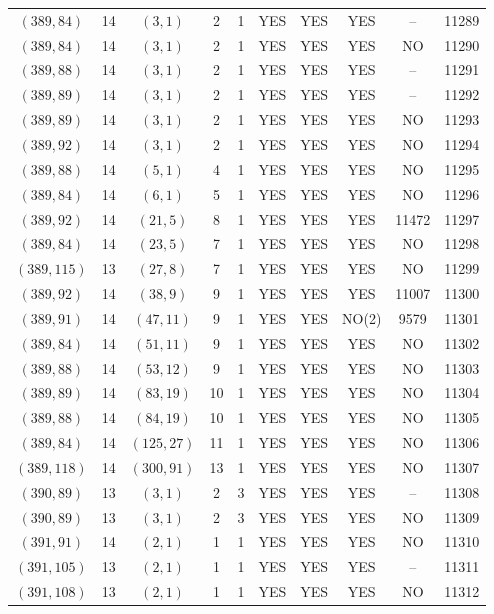 \begin{longtable}{|c|c|c|c|c|c|c|c|c|c|}
$(389, 84)$ & 14 & $(3, 1)$ & 2 & 1 & YES & YES & YES & -- & 11289\\
$(389, 84)$ & 14 & $(3, 1)$ & 2 & 1 & YES & YES & YES & NO & 11290\\
$(389, 88)$ & 14 & $(3, 1)$ & 2 & 1 & YES & YES & YES & -- & 11291\\
$(389, 89)$ & 14 & $(3, 1)$ & 2 & 1 & YES & YES & YES & -- & 11292\\
$(389, 89)$ & 14 & $(3, 1)$ & 2 & 1 & YES & YES & YES & NO & 11293\\
$(389, 92)$ & 14 & $(3, 1)$ & 2 & 1 & YES & YES & YES & NO & 11294\\
$(389, 88)$ & 14 & $(5, 1)$ & 4 & 1 & YES & YES & YES & NO & 11295\\
$(389, 84)$ & 14 & $(6, 1)$ & 5 & 1 & YES & YES & YES & NO & 11296\\
$(389, 92)$ & 14 & $(21, 5)$ & 8 & 1 & YES & YES & YES & 11472 & 11297\\
$(389, 84)$ & 14 & $(23, 5)$ & 7 & 1 & YES & YES & YES & NO & 11298\\
$(389, 115)$ & 13 & $(27, 8)$ & 7 & 1 & YES & YES & YES & NO & 11299\\
$(389, 92)$ & 14 & $(38, 9)$ & 9 & 1 & YES & YES & YES & 11007 & 11300\\
$(389, 91)$ & 14 & $(47, 11)$ & 9 & 1 & YES & YES & NO(2) & 9579 & 11301\\
$(389, 84)$ & 14 & $(51, 11)$ & 9 & 1 & YES & YES & YES & NO & 11302\\
$(389, 88)$ & 14 & $(53, 12)$ & 9 & 1 & YES & YES & YES & NO & 11303\\
$(389, 89)$ & 14 & $(83, 19)$ & 10 & 1 & YES & YES & YES & NO & 11304\\
$(389, 88)$ & 14 & $(84, 19)$ & 10 & 1 & YES & YES & YES & NO & 11305\\
$(389, 84)$ & 14 & $(125, 27)$ & 11 & 1 & YES & YES & YES & NO & 11306\\
$(389, 118)$ & 14 & $(300, 91)$ & 13 & 1 & YES & YES & YES & NO & 11307\\
$(390, 89)$ & 13 & $(3, 1)$ & 2 & 3 & YES & YES & YES & -- & 11308\\
$(390, 89)$ & 13 & $(3, 1)$ & 2 & 3 & YES & YES & YES & NO & 11309\\
$(391, 91)$ & 14 & $(2, 1)$ & 1 & 1 & YES & YES & YES & NO & 11310\\
$(391, 105)$ & 13 & $(2, 1)$ & 1 & 1 & YES & YES & YES & -- & 11311\\
$(391, 108)$ & 13 & $(2, 1)$ & 1 & 1 & YES & YES & YES & NO & 11312\\

\end{longtable}
